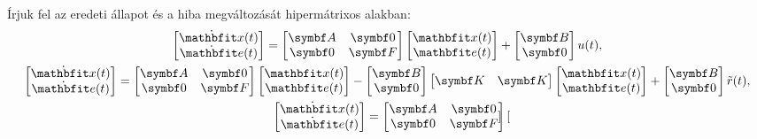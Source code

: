 Írjuk fel az eredeti állapot és a hiba megváltozását hipermátrixos alakban:
\begin{gather}
  \begin{bmatrix}
    \dot{\rvec x}(t) \\ \dot{\rvec e}(t)
  \end{bmatrix} = \begin{bmatrix}
    \rmat A & \rmat 0 \\ \rmat 0 & \rmat F
  \end{bmatrix} \begin{bmatrix}
    \rvec x(t) \\ \rvec e(t)
  \end{bmatrix} + \begin{bmatrix}
    \rmat B \\ \rmat 0
  \end{bmatrix} u(t)
  ,
  \\
  \begin{bmatrix}
    \dot{\rvec x}(t) \\ \dot{\rvec e}(t)
  \end{bmatrix} = \begin{bmatrix}
    \rmat A & \rmat 0 \\ \rmat 0 & \rmat F
  \end{bmatrix} \begin{bmatrix}
    \rvec x(t) \\ \rvec e(t)
  \end{bmatrix} - \begin{bmatrix}
    \rmat B \\ \rmat 0
  \end{bmatrix} \begin{bmatrix}
    \rmat K & \rmat K
  \end{bmatrix} \begin{bmatrix}
    \rvec x(t) \\ \rvec e(t)
  \end{bmatrix} + \begin{bmatrix}
    \rmat B \\ \rmat 0
  \end{bmatrix} \tilde r(t)
  ,
  \\
  \begin{bmatrix}
    \dot{\rvec x}(t) \\ \dot{\rvec e}(t)
  \end{bmatrix} = \begin{bmatrix}
    \rmat A & \rmat 0 \\ \rmat 0 & \rmat F
  \end{bmatrix} \begin{bmatrix}

\end{bmatrix}
\end{gather}
